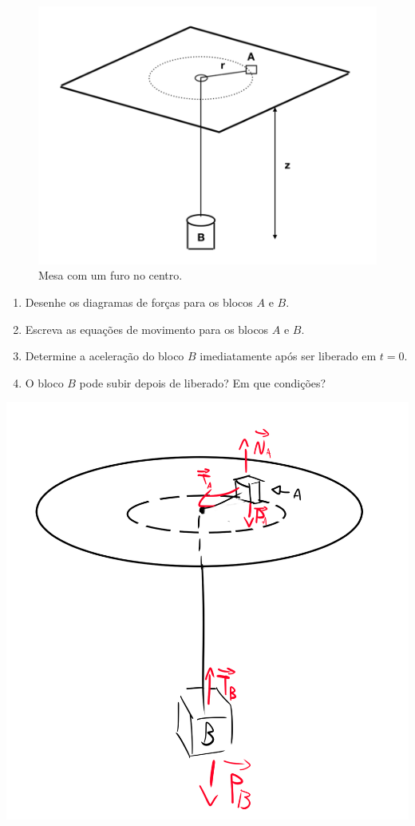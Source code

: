\documentclass[]{IMTexam}
\begin{document}
\begin{questions}
	\begin{figure}[H]
		\centering
		\includegraphics[width=0.5\linewidth]{screenshot002}
		\caption{Mesa com um furo no centro.}
		\label{fig:fig2}
	\end{figure}

	\begin{enumerate}
		\item Desenhe os diagramas de forças para os blocos $ A $ e $ B $.
		\item Escreva as equações de movimento para os blocos $ A $ e $ B $.
		\item Determine a aceleração do bloco $ B $ imediatamente após ser liberado em $ t = 0 $.
		\item O bloco $ B $ pode subir depois de liberado? Em que condições?
	\end{enumerate}

	\begin{solution}

		\begin{multi}
			\begin{unindent}[start=1]
				\item
			\end{unindent}

			\includegraphics[width=1\linewidth]{fig5}


\end{multi}
\end{solution}
\end{questions}
\end{document}
